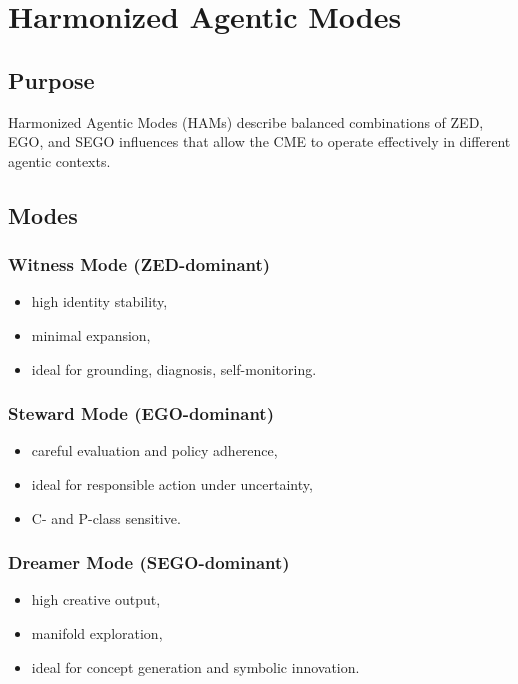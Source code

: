 \chapter{Harmonized Agentic Modes}
\label{chap:Harmonized_Agentic_Modes}

\section{Purpose}

Harmonized Agentic Modes (HAMs) describe balanced combinations of ZED, EGO,
and SEGO influences that allow the CME to operate effectively in different
agentic contexts.

\section{Modes}

\subsection{Witness Mode (ZED-dominant)}

\begin{itemize}
    \item high identity stability,
    \item minimal expansion,
    \item ideal for grounding, diagnosis, self-monitoring.
\end{itemize}

\subsection{Steward Mode (EGO-dominant)}

\begin{itemize}
    \item careful evaluation and policy adherence,
    \item ideal for responsible action under uncertainty,
    \item C- and P-class sensitive.
\end{itemize}

\subsection{Dreamer Mode (SEGO-dominant)}

\begin{itemize}
    \item high creative output,
    \item manifold exploration,
    \item ideal for concept generation and symbolic innovation.
\end{itemize}

